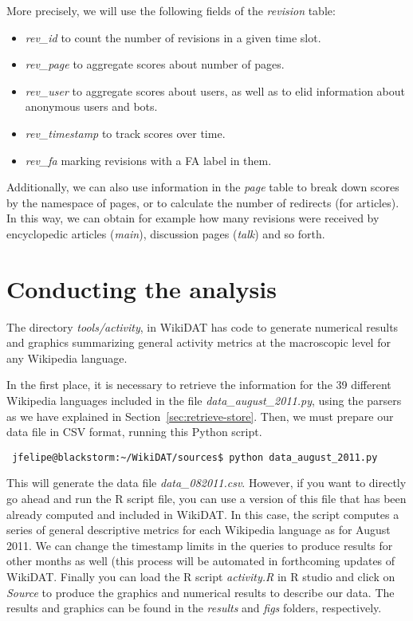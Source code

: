 More precisely, we will use the following fields of the \textit{revision} table:

\begin{itemize}
 \item \textit{rev\_id} to count the number of revisions in a given time slot.
 \item \textit{rev\_page} to aggregate scores about number of pages.
 \item \textit{rev\_user} to aggregate scores about users, as well as to elid
information about anonymous users and bots.
 \item \textit{rev\_timestamp} to track scores over time.
 \item \textit{rev\_fa} marking revisions with a FA label in them.
\end{itemize}

Additionally, we can also use information in the \textit{page} table to break
down scores by the namespace of pages, or to calculate the number of
redirects (for articles). In this way, we can obtain for example
how many revisions were received by encyclopedic articles (\textit{main}),
discussion pages (\textit{talk}) and so forth.

\section{Conducting the analysis}
The directory \textit{tools/activity}, in WikiDAT has code to generate 
numerical results and graphics summarizing general
activity metrics at the macroscopic level for any Wikipedia language. 

In the first place, it is necessary to retrieve the information for the 39 different
Wikipedia languages included in the file \textit{data\_august\_2011.py}, using
the parsers as we have explained in Section~\ref{sec:retrieve-store}. Then, we
must prepare our data file in CSV format, running this Python script.

\begin{verbatim}
 jfelipe@blackstorm:~/WikiDAT/sources$ python data_august_2011.py
\end{verbatim}

This will generate the data file \textit{data\_082011.csv}. However, if you want
to directly go ahead and run the R script file, you can use a version of this
file that has been already computed and included in WikiDAT. In this case, the
script computes a series of general descriptive metrics for each Wikipedia
language as for August 2011. We can change the timestamp limits in the queries
to produce results for other months as well (this process will be automated in
forthcoming updates of WikiDAT. Finally you can
load the R script \textit{activity.R} in R studio and click on \textit{Source}
to produce the graphics and numerical results to describe our data. The results
and graphics can be found in the \textit{results} and \textit{figs} folders,
respectively.

